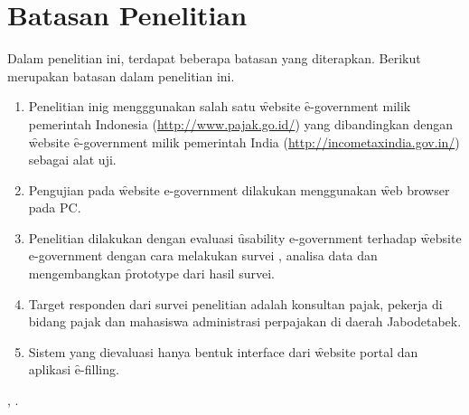 \section{Batasan Penelitian}
Dalam penelitian ini, terdapat beberapa batasan yang diterapkan. Berikut merupakan batasan dalam penelitian ini.
\begin{enumerate}
	\item Penelitian inig mengggunakan salah satu \f{website} \f{e-government} milik pemerintah Indonesia (\url{http://www.pajak.go.id/}) yang dibandingkan dengan \f{website} \f{e-government} milik pemerintah India (\url{http://incometaxindia.gov.in/}) sebagai alat uji.
	\item Pengujian pada \f{website e-government} dilakukan menggunakan \f{web browser} pada PC.
	\item Penelitian dilakukan dengan evaluasi \f{usability e-government} terhadap \f{website e-government} dengan cara melakukan survei \ust, analisa data dan mengembangkan \f{prototype} dari hasil survei.
	\item Target responden dari survei penelitian adalah konsultan pajak, pekerja di bidang pajak dan mahasiswa administrasi perpajakan di daerah Jabodetabek.
	\item Sistem yang dievaluasi hanya bentuk interface dari \f{website} portal dan aplikasi \f{e-filling}.
\end{enumerate} , .  
